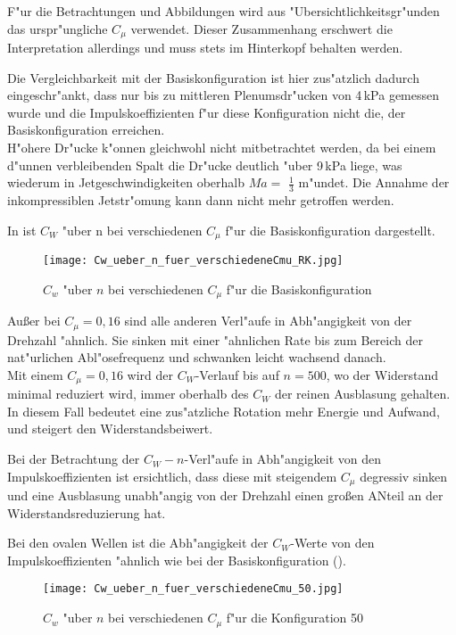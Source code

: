 F"ur die Betrachtungen und Abbildungen wird aus "Ubersichtlichkeitsgr"unden das urspr"ungliche $C_{\mu}$ verwendet. Dieser Zusammenhang erschwert die Interpretation allerdings und muss stets im Hinterkopf behalten werden.

Die Vergleichbarkeit mit der Basiskonfiguration ist hier zus"atzlich dadurch eingeschr"ankt, dass nur bis zu mittleren Plenumsdr"ucken von 4\,kPa gemessen wurde und die Impulskoeffizienten f"ur diese Konfiguration nicht die, der Basiskonfiguration erreichen.\\
H"ohere Dr"ucke k"onnen gleichwohl nicht mitbetrachtet werden, da bei einem d"unnen verbleibenden Spalt die Dr"ucke deutlich "uber 9\,kPa liege, was wiederum in Jetgeschwindigkeiten oberhalb $Ma =$ $\frac{1}{3}$ m"undet. Die Annahme der inkompressiblen Jetstr"omung kann dann nicht mehr getroffen werden.

In  ist $C_{W}$ "uber n bei verschiedenen $C_{\mu}$ f"ur die Basiskonfiguration dargestellt.

\begin{figure}[h]
	\centering
	\texttt{[image: Cw\_ueber\_n\_fuer\_verschiedeneCmu\_RK.jpg]}
	\caption{$C_{w}$ "uber $n$ bei verschiedenen $C_{\mu}$ f"ur die Basiskonfiguration}
	\label{fig:Cw/n bei Cmu RK}
\end{figure}

Au\ss{}er bei $C_{\mu}= 0,16$ sind alle anderen Verl"aufe in Abh"angigkeit von der Drehzahl "ahnlich.
Sie sinken mit einer "ahnlichen Rate bis zum Bereich der nat"urlichen Abl"osefrequenz und schwanken leicht wachsend danach.\\Mit einem $C_{\mu}= 0,16$ wird der $C_{W}$-Verlauf bis auf $n= 500$, wo der Widerstand minimal reduziert wird, immer oberhalb des $C_{W}$ der reinen Ausblasung gehalten. In diesem Fall bedeutet eine zus"atzliche Rotation mehr Energie und Aufwand, und steigert den Widerstandsbeiwert.

Bei der Betrachtung der $C_{W}-n$-Verl"aufe in Abh"angigkeit von den Impulskoeffizienten ist ersichtlich, dass diese mit steigendem $C_{\mu}$ degressiv sinken und eine Ausblasung unabh"angig von der Drehzahl einen gro\ss{}en ANteil an der Widerstandsreduzierung hat.

Bei den ovalen Wellen ist die Abh"angigkeit der $C_{W}$-Werte von den Impulskoeffizienten "ahnlich wie bei der Basiskonfiguration ().
\begin{figure}[h]
	\centering
	\texttt{[image: Cw\_ueber\_n\_fuer\_verschiedeneCmu\_50.jpg]}
	\caption{$C_{w}$ "uber $n$ bei verschiedenen $C_{\mu}$ f"ur die Konfiguration 50}
	\label{fig:Cw/n bei Cmu 50}
\end{figure}

